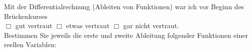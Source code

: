 \documentclass[12pt,answers]{exam}
\begin{document}
\begin{questions}
\begin{solution}
\end{solution}
\pagebreak


Mit der Differentialrechnung (Ableiten von Funktionen) war ich vor Beginn des Brückenkurses\\ $\Box$ gut vertraut \hfill $\Box$ etwas vertraut \hfill $\Box$ gar nicht vertraut. \\[2ex]
Bestimmen Sie jeweils die erste und zweite Ableitung folgender
Funktionen einer reellen Variablen:\\
\begin{solution}
\begin{parts}

\part \[\begin{array}{ll}
 f(x)  &=x^5\\ ~~\\
 f'(x) &= 5x^4\\ ~~\\
 f''(x)&= 20x^3\\ ~~\\
\end{array}~~~~~~~~~~~~~~~~~~~~~~~~~~~~~~~~~~~~~~~~~~~~~~~~~~~~~~~~~~~~~~~~~~~~\]


\end{parts}
\end{solution}
\end{questions}
\end{document}
